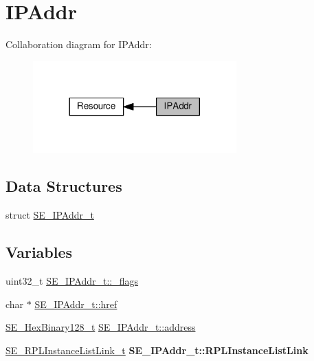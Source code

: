 \hypertarget{group__IPAddr}{}\section{I\+P\+Addr}
\label{group__IPAddr}
Collaboration diagram for I\+P\+Addr\+:\nopagebreak
\begin{figure}[H]
\begin{center}
\leavevmode
\includegraphics[width=222pt]{group__IPAddr}
\end{center}
\end{figure}
\subsection*{Data Structures}
\begin{DoxyCompactItemize}
\item 
struct \hyperlink{structSE__IPAddr__t}{S\+E\+\_\+\+I\+P\+Addr\+\_\+t}
\end{DoxyCompactItemize}
\subsection*{Variables}
\begin{DoxyCompactItemize}
\item 
uint32\+\_\+t \hyperlink{group__IPAddr_ga557111ee3a94eb2e68cf42e62bfba40a}{S\+E\+\_\+\+I\+P\+Addr\+\_\+t\+::\+\_\+flags}
\item 
char $\ast$ \hyperlink{group__IPAddr_ga3cd3e44c3eb563d397ff73361448715a}{S\+E\+\_\+\+I\+P\+Addr\+\_\+t\+::href}
\item 
\hyperlink{group__HexBinary128_gae3e6f0afe8ab371017bc37a0831926c5}{S\+E\+\_\+\+Hex\+Binary128\+\_\+t} \hyperlink{group__IPAddr_gabca0c11bd5af2bce6a3d2537dff98fe3}{S\+E\+\_\+\+I\+P\+Addr\+\_\+t\+::address}
\item 
\mbox{\label{group__IPAddr_gad0487186e7e81e6daaaf1b8c894061f8}} 
\hyperlink{structSE__RPLInstanceListLink__t}{S\+E\+\_\+\+R\+P\+L\+Instance\+List\+Link\+\_\+t} {\bfseries S\+E\+\_\+\+I\+P\+Addr\+\_\+t\+::\+R\+P\+L\+Instance\+List\+Link}
\end{DoxyCompactItemize}


